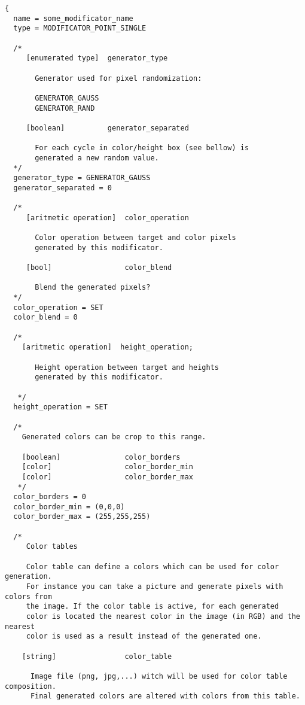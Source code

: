 \documentclass[11pt]{article}
\begin{document}
\begin{verbatim}
{
  name = some_modificator_name
  type = MODIFICATOR_POINT_SINGLE

  /*    
     [enumerated type]  generator_type
     
       Generator used for pixel randomization:
       
       GENERATOR_GAUSS
       GENERATOR_RAND
      
     [boolean]          generator_separated
     
       For each cycle in color/height box (see bellow) is
       generated a new random value.
  */
  generator_type = GENERATOR_GAUSS
  generator_separated = 0
    
  /*      
     [aritmetic operation]  color_operation
     
       Color operation between target and color pixels 
       generated by this modificator.
     
     [bool]                 color_blend
     
       Blend the generated pixels?
  */      
  color_operation = SET
  color_blend = 0
  
  /*      
    [aritmetic operation]  height_operation;
    
       Height operation between target and heights
       generated by this modificator.
    
   */
  height_operation = SET

  /*
    Generated colors can be crop to this range.
  
    [boolean]               color_borders
    [color]                 color_border_min
    [color]                 color_border_max
   */
  color_borders = 0
  color_border_min = (0,0,0)
  color_border_max = (255,255,255)
  
  /*
     Color tables 
     
     Color table can define a colors which can be used for color generation. 
     For instance you can take a picture and generate pixels with colors from
     the image. If the color table is active, for each generated
     color is located the nearest color in the image (in RGB) and the nearest 
     color is used as a result instead of the generated one.
     
    [string]                color_table
      
      Image file (png, jpg,...) witch will be used for color table composition. 
      Final generated colors are altered with colors from this table.
    

\end{verbatim}
\end{document}
